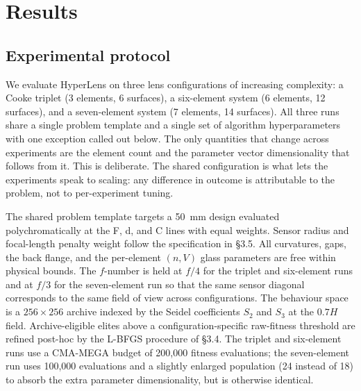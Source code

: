 
\section{Results}
\label{sec:results}

\subsection{Experimental protocol}
\label{sec:results-protocol}

We evaluate HyperLens on three lens configurations of increasing complexity: a Cooke triplet (3 elements, 6 surfaces), a six-element system (6 elements, 12 surfaces), and a seven-element system (7 elements, 14 surfaces). All three runs share a single problem template and a single set of algorithm hyperparameters with one exception called out below. The only quantities that change across experiments are the element count and the parameter vector dimensionality that follows from it. This is deliberate. The shared configuration is what lets the experiments speak to scaling: any difference in outcome is attributable to the problem, not to per-experiment tuning.

The shared problem template targets a 50~mm design evaluated polychromatically at the F, d, and C lines with equal weights. Sensor radius and focal-length penalty weight follow the specification in \S3.5. All curvatures, gaps, the back flange, and the per-element $(n, V)$ glass parameters are free within physical bounds. The $f$-number is held at $f/4$ for the triplet and six-element runs and at $f/3$ for the seven-element run so that the same sensor diagonal corresponds to the same field of view across configurations. The behaviour space is a $256 \times 256$ archive indexed by the Seidel coefficients $S_2$ and $S_3$ at the $0.7H$ field. Archive-eligible elites above a configuration-specific raw-fitness threshold are refined post-hoc by the L-BFGS procedure of \S3.4. The triplet and six-element runs use a CMA-MEGA budget of 200{,}000 fitness evaluations; the seven-element run uses 100{,}000 evaluations and a slightly enlarged population (24 instead of 18) to absorb the extra parameter dimensionality, but is otherwise identical.


